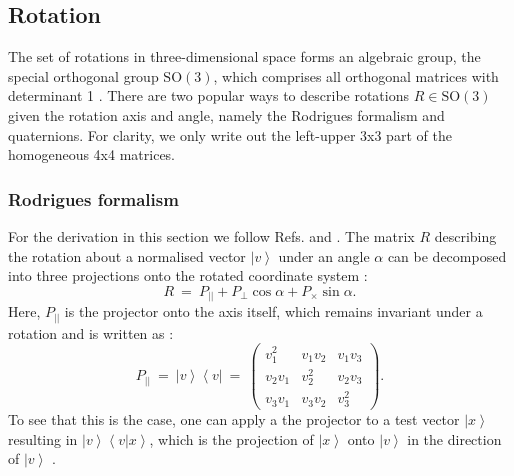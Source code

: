\subsection{Rotation}
The set of rotations in three-dimensional space forms an algebraic group, the special orthogonal group $\mathrm{SO\left(3\right)}$,
which comprises all orthogonal matrices with determinant 1 \cite[pp. 849-851]{Arfken2013}.
There are two popular ways to describe rotations $R \in \mathrm{SO\left(3\right)}$ given the rotation axis and angle, 
namely the Rodrigues formalism and quaternions. 
For clarity, we only write out the left-upper 3x3 part of the homogeneous 4x4 matrices.


\subsubsection{Rodrigues formalism}
For the derivation in this section we follow Refs. \cite[p. 718, p. 816]{Arens2015} and \cite{wiki_rodrigues}.
The matrix $R$ describing the rotation about a normalised vector $\left|v\right>$ under an angle $\alpha$ can be decomposed into
three projections onto the rotated coordinate system \cite[p. 718, p. 816]{Arens2015}:
\begin{equation}
	\boxed{R \ = \ P_{||} + P_{\perp} \cos \alpha + P_{\times} \sin \alpha.}
	\label{eq:rodrigues}
\end{equation}
Here, $P_{||}$ is the projector onto the axis itself, which remains invariant under a rotation and is written as \cite[p. 814]{Arens2015}:
\begin{equation}
	P_{||} \ =\ \left|v\right> \left<v\right| \ =\ 
		\left( \begin{array}{ccc} 
			v_1^2   &    v_1 v_2 &       v_1 v_3 \\
			v_2 v_1 &      v_2^2 &       v_2 v_3 \\
			v_3 v_1 &    v_3 v_2 &         v_3^2
		\end{array} \right).
\end{equation}
To see that this is the case, one can apply a the projector to a test vector $\left| x \right>$ resulting in $\left|v\right> \left<v | x \right>$,
which is the projection of $\left| x \right>$ onto $\left| v \right>$ in the direction of $\left| v \right>$ \cite[p. 814]{Arens2015}.

